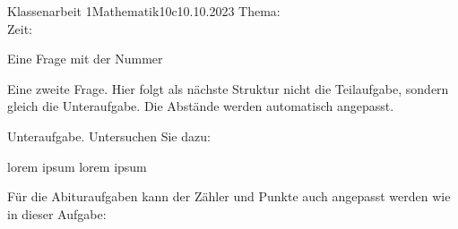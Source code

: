 \documentclass[12pt]{../exam2e}
\begin{document}
\begin{klassenarbeitskopf}{Klassenarbeit 1}{Mathematik}{10c}{10.10.2023}
	Thema:\\
	Zeit:	
\end{klassenarbeitskopf}


\begin{questions}%



\begin{question}[3]
	Eine Frage mit der Nummer \thequestion
{}
\end{question}%

\question[2] Eine zweite Frage. Hier folgt als nächste Struktur nicht die Teilaufgabe, sondern gleich die Unteraufgabe. Die Abstände werden automatisch angepasst.
\begin{subparts}
		\subpart Unteraufgabe. Untersuchen Sie  dazu:
	\begin{subsubparts}
		\subsubpart lorem ipsum
		\subsubpart lorem ipsum
	\end{subsubparts}
\end{subparts}



\clearpage

\renewcommand{\thesubpart}{\arabic{subpart}}%
\renewcommand{\subpartlabel}{\thequestion.\thepartno.\thesubpart}%
\question
Für die Abituraufgaben kann der Zähler und Punkte auch angepasst werden wie in dieser Aufgabe: 



\end{questions}%
\end{document}
